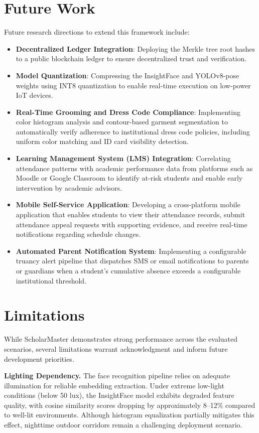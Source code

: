 \documentclass[12pt,a4paper,oneside]{report}
\begin{document}
\section{Future Work}
Future research directions to extend this framework include:
\begin{itemize}
    \item \textbf{Decentralized Ledger Integration}: Deploying the Merkle tree root hashes to a public blockchain ledger to ensure decentralized trust and verification.
    \item \textbf{Model Quantization}: Compressing the InsightFace and YOLOv8-pose weights using INT8 quantization to enable real-time execution on low-power IoT devices.
    \item \textbf{Real-Time Grooming and Dress Code Compliance}: Implementing color histogram analysis and contour-based garment segmentation to automatically verify adherence to institutional dress code policies, including uniform color matching and ID card visibility detection.
    \item \textbf{Learning Management System (LMS) Integration}: Correlating attendance patterns with academic performance data from platforms such as Moodle or Google Classroom to identify at-risk students and enable early intervention by academic advisors.
    \item \textbf{Mobile Self-Service Application}: Developing a cross-platform mobile application that enables students to view their attendance records, submit attendance appeal requests with supporting evidence, and receive real-time notifications regarding schedule changes.
    \item \textbf{Automated Parent Notification System}: Implementing a configurable truancy alert pipeline that dispatches SMS or email notifications to parents or guardians when a student's cumulative absence exceeds a configurable institutional threshold.
\end{itemize}

\section{Limitations}
While ScholarMaster demonstrates strong performance across the evaluated scenarios, several limitations warrant acknowledgment and inform future development priorities.

\textbf{Lighting Dependency.} The face recognition pipeline relies on adequate illumination for reliable embedding extraction. Under extreme low-light conditions (below 50 lux), the InsightFace model exhibits degraded feature quality, with cosine similarity scores dropping by approximately 8--12\% compared to well-lit environments. Although histogram equalization partially mitigates this effect, nighttime outdoor corridors remain a challenging deployment scenario.
\end{document}
